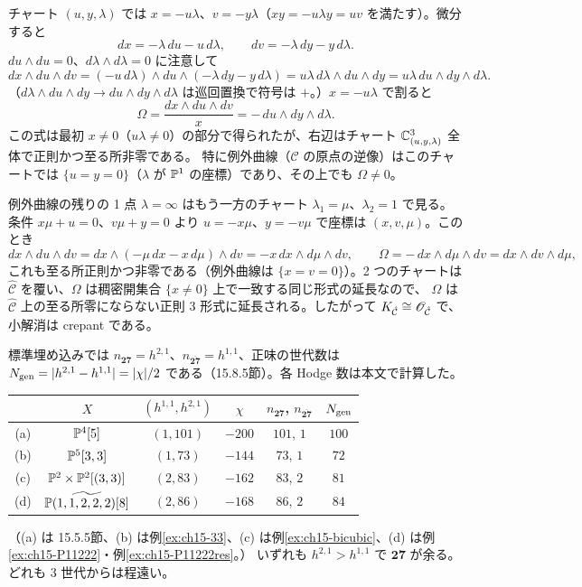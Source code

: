 チャート $(u,y,\lambda)$ では $x = -u\lambda$、$v = -y\lambda$（$xy = -u\lambda y = uv$ を満たす）。微分すると
\[
dx = -\lambda\,du - u\,d\lambda,\qquad dv = -\lambda\,dy - y\,d\lambda .
\]
$du\wedge du = 0$、$d\lambda\wedge d\lambda = 0$ に注意して
\[
dx\wedge du\wedge dv = (-u\,d\lambda)\wedge du\wedge(-\lambda\,dy - y\,d\lambda) = u\lambda\,d\lambda\wedge du\wedge dy = u\lambda\,du\wedge dy\wedge d\lambda .
\]
（$d\lambda\wedge du\wedge dy\to du\wedge dy\wedge d\lambda$ は巡回置換で符号は $+$。）$x = -u\lambda$ で割ると
\[
\Omega = \frac{dx\wedge du\wedge dv}{x} = -\,du\wedge dy\wedge d\lambda .
\]
この式は最初 $x\neq0$（$u\lambda\neq0$）の部分で得られたが、右辺はチャート $\mathbb{C}^3_{(u,y,\lambda)}$ 全体で正則かつ至る所非零である。
特に例外曲線（$\mathcal C$ の原点の逆像）はこのチャートでは $\{u = y = 0\}$（$\lambda$ が $\mathbb{P}^1$ の座標）であり、その上でも $\Omega\ne0$。

例外曲線の残りの 1 点 $\lambda = \infty$ はもう一方のチャート $\lambda_1 = \mu$、$\lambda_2 = 1$ で見る。条件 $x\mu + u = 0$、$v\mu + y = 0$ より $u = -x\mu$、$y = -v\mu$ で座標は $(x,v,\mu)$。このとき
\[
dx\wedge du\wedge dv = dx\wedge(-\mu\,dx - x\,d\mu)\wedge dv = -x\,dx\wedge d\mu\wedge dv,\qquad
\Omega = -\,dx\wedge d\mu\wedge dv = dx\wedge dv\wedge d\mu ,
\]
これも至る所正則かつ非零である（例外曲線は $\{x = v = 0\}$）。2 つのチャートは $\hat{\mathcal C}$ を覆い、$\Omega$ は稠密開集合 $\{x\neq0\}$ 上で一致する同じ形式の延長なので、
$\Omega$ は $\hat{\mathcal C}$ 上の至る所零にならない正則 3 形式に延長される。したがって $K_{\hat{\mathcal C}}\cong\mathscr{O}_{\hat{\mathcal C}}$ で、小解消は crepant である。

標準埋め込みでは $n_{\mathbf{27}} = h^{2,1}$、$n_{\overline{\mathbf{27}}} = h^{1,1}$、正味の世代数は $N_{\rm gen} = |h^{2,1}-h^{1,1}| = |\chi|/2$ である（15.8.5節）。各 Hodge 数は本文で計算した。
\begin{center}
\renewcommand{\arraystretch}{1.3}
\begin{tabular}{c|c|c|c|c|c}
& $X$ & $(h^{1,1},h^{2,1})$ & $\chi$ & $n_{\mathbf{27}}$, $n_{\overline{\mathbf{27}}}$ & $N_{\rm gen}$\\ \hline
(a) & $\mathbb{P}^4[5]$ & $(1,101)$ & $-200$ & $101$, $1$ & $100$\\
(b) & $\mathbb{P}^5[3,3]$ & $(1,73)$ & $-144$ & $73$, $1$ & $72$\\
(c) & $\mathbb{P}^2\times\mathbb{P}^2[(3,3)]$ & $(2,83)$ & $-162$ & $83$, $2$ & $81$\\
(d) & $\widetilde{\mathbb{P}(1,1,2,2,2)[8]}$ & $(2,86)$ & $-168$ & $86$, $2$ & $84$\\
\end{tabular}
\end{center}
（(a) は 15.5.5節、(b) は例\ref{ex:ch15-33}、(c) は例\ref{ex:ch15-bicubic}、(d) は例\ref{ex:ch15-P11222}・例\ref{ex:ch15-P11222res}。）
いずれも $h^{2,1}>h^{1,1}$ で $\mathbf{27}$ が余る。どれも 3 世代からは程遠い。

